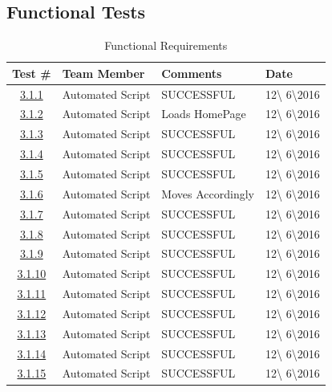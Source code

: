 \documentclass{article}
\begin{document}
\subsection{Functional Tests}
\begin{table}[H]
\caption{Functional Requirements}
	\begin{tabularx}{\textwidth}{| c | l | X | l |}
	\toprule
	Test \#& Team Member &Comments &Date\\
	\midrule
	\hyperref[sec:3.1.1]{3.1.1}& Automated Script  & SUCCESSFUL & 12\textbackslash
	6\textbackslash2016\\
	\hyperref[sec:3.1.2]{3.1.2}& Automated Script  & Loads HomePage & 12\textbackslash
	6\textbackslash2016\\
	\hyperref[sec:3.1.3]{3.1.3}& Automated Script  & SUCCESSFUL & 12\textbackslash
	6\textbackslash2016\\
	\hyperref[sec:3.1.4]{3.1.4}& Automated Script  & SUCCESSFUL & 12\textbackslash
	6\textbackslash2016\\
	\hyperref[sec:3.1.5]{3.1.5}& Automated Script  & SUCCESSFUL & 12\textbackslash
	6\textbackslash2016\\
	\hyperref[sec:3.1.6]{3.1.6}& Automated Script  & Moves Accordingly & 12\textbackslash
	6\textbackslash2016\\
	\hyperref[sec:3.1.7]{3.1.7}& Automated Script  & SUCCESSFUL & 12\textbackslash
	6\textbackslash2016\\
	\hyperref[sec:3.1.8]{3.1.8}& Automated Script  & SUCCESSFUL & 12\textbackslash
	6\textbackslash2016\\
	\hyperref[sec:3.1.9]{3.1.9}& Automated Script  & SUCCESSFUL & 12\textbackslash
	6\textbackslash2016\\
	\hyperref[sec:3.1.10]{3.1.10}& Automated Script  & SUCCESSFUL & 12\textbackslash
	6\textbackslash2016\\
	\hyperref[sec:3.1.11]{3.1.11}& Automated Script  & SUCCESSFUL & 12\textbackslash
	6\textbackslash2016\\
	\hyperref[sec:3.1.12]{3.1.12}& Automated Script  & SUCCESSFUL & 12\textbackslash
	6\textbackslash2016\\
	\hyperref[sec:3.1.3]{3.1.13}& Automated Script  & SUCCESSFUL & 12\textbackslash
	6\textbackslash2016\\
	\hyperref[sec:3.1.4]{3.1.14}& Automated Script  & SUCCESSFUL & 12\textbackslash
	6\textbackslash2016\\
	\hyperref[sec:3.1.5]{3.1.15}& Automated Script  & SUCCESSFUL & 12\textbackslash
	6\textbackslash2016\\

\end{tabularx}
\end{table}
\end{document}
